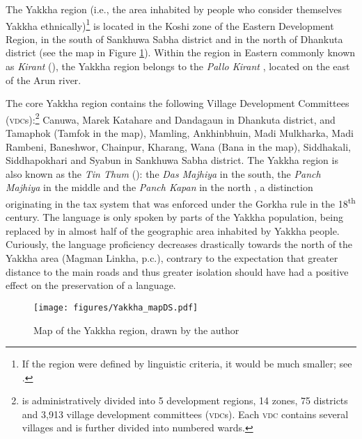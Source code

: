 The Yakkha region (i.e., the area inhabited by people who consider themselves Yakkha ethnically)\footnote{If the region were defined by linguistic criteria, it would be much smaller; see .} is located in the Koshi zone of the Eastern Development Region, in the south of Sankhuwa Sabha district and in the north of Dhankuta  district  (see the map in Figure \ref{map-sank}). Within the region in  Eastern  commonly known as \emph{Kirant} (), the Yakkha region belongs to the \emph{Pallo Kirant} , located on the east of the Arun river. 

The core Yakkha region contains the following Village Development Committees (\textsc{vdc}s):\footnote{ is administratively divided into 5 development regions, 14 zones, 75 districts and  3,913 village development committees (\textsc{vdc}s). Each \textsc{vdc}  contains several villages and is further divided into numbered wards.} Canuwa, Marek Katahare and Dandagaun in Dhankuta district, and Tamaphok (Tamfok in the map), Mamling, Ankhinbhuin, Madi Mulkharka, Madi Rambeni, Baneshwor, Chainpur, Kharang, Wana (Bana in the map), Siddhakali, Siddhapokhari and Syabun in Sankhuwa Sabha district. The Yakkha region is also known as the \emph{Tin Thum} (): the \emph{Das Majhiya} in the south, the \emph{Panch Majhiya} in the middle and the \emph{Panch Kapan} in the north  \citep[86]{Kongren2007Indigenous}, a distinction originating in the tax system that was enforced under the Gorkha rule in the 18\textsuperscript{th} century. The language is  only spoken by parts of the Yakkha population, being replaced by  in almost half of the geographic area inhabited by Yakkha people. Curiously, the language proficiency decreases drastically towards the north of the Yakkha area (Magman Linkha, p.c.), contrary to the expectation that greater distance to the main roads and thus greater isolation should have had a positive effect on the preservation of a language. 


\begin{figure}[p]
\centering
\texttt{[image: figures/Yakkha\_mapDS.pdf]}
\caption{Map of the Yakkha region, drawn by the author}\label{map-sank}
\end{figure}



